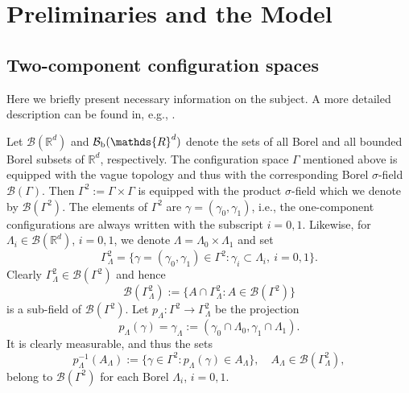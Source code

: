 \documentclass[reqno,11pt]{amsart}
\theoremstyle{definition}
\theoremstyle{remark}
\numberwithin{equation}{section}
\begin{document}
\section{Preliminaries and the Model}
\label{Sq2}
\subsection{Two-component configuration spaces}

Here we briefly present necessary information on the subject. A more
detailed description can be found in, e.g.,  \cite{F,FKKO,FKO1}.

Let $\mathcal{B}(\mathds{R}^d)$ and $\mathcal{B}_{\rm
b}(\mathds{R}^d)$ denote the sets of all Borel and all bounded Borel
subsets of $\mathds{R}^d$, respectively. The configuration space
$\Gamma$ mentioned above is equipped with the vague topology and
thus with the corresponding Borel $\sigma$-field
$\mathcal{B}(\Gamma)$. Then $\Gamma^2:= \Gamma \times \Gamma$ is
equipped with the product $\sigma$-field which we denote by
$\mathcal{B}(\Gamma^2)$. The elements of $\Gamma^2$ are $\gamma =
(\gamma_0, \gamma_1)$, i.e., the one-component configurations are
always written with the subscript $i=0,1$. Likewise, for
$\Lambda_i\in \mathcal{B}(\mathds{R}^d)$, $i=0,1$, we denote
$\Lambda = \Lambda_0 \times \Lambda_1$ and set
\[
\Gamma^2_\Lambda = \{\gamma=(\gamma_0, \gamma_1)\in \Gamma^2:
\gamma_i \subset \Lambda_i, \ i=0,1\}.
\]
Clearly $\Gamma^2_\Lambda \in \mathcal{B}(\Gamma^2)$ and hence
\[
 \mathcal{B}(\Gamma^2_\Lambda):=\{ A \cap \Gamma^2_\Lambda : A \in \mathcal{B}(\Gamma^2)\}
\]
is a sub-field of $\mathcal{B}(\Gamma^2)$. Let
$p_{\Lambda}:\Gamma^2\to \Gamma^2_\Lambda$ be the projection
\begin{equation*}
 
 p_\Lambda (\gamma) = \gamma_\Lambda := (\gamma_0 \cap \Lambda_0, \gamma_1 \cap \Lambda_1).
\end{equation*}
It is clearly measurable, and thus the sets
\begin{equation*}
 p^{-1}_\Lambda(A_\Lambda) :=\{ \gamma\in \Gamma^2: p_\Lambda (\gamma) \in A_\Lambda \},
 \quad A_\Lambda \in \mathcal{B}(\Gamma^2_\Lambda),
\end{equation*}
belong to $\mathcal{B}(\Gamma^2)$ for each Borel $\Lambda_i$,
$i=0,1$.
\end{document}
